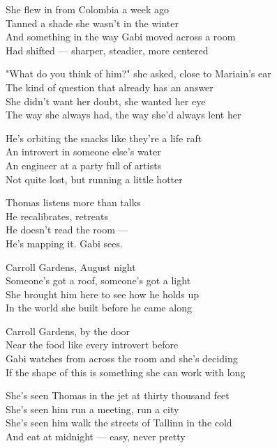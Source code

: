 \begin{lyrics}

She flew in from Colombia a week ago\\
Tanned a shade she wasn't in the winter\\
And something in the way Gabi moved across a room\\
Had shifted — sharper, steadier, more centered

"What do you think of him?" she asked, close to Mariain's ear\\
The kind of question that already has an answer\\
She didn't want her doubt, she wanted her eye\\
The way she always had, the way she'd always lent her

He's orbiting the snacks like they're a life raft\\
An introvert in someone else's water\\
An engineer at a party full of artists\\
Not quite lost, but running a little hotter

Thomas listens more than talks\\
He recalibrates, retreats\\
He doesn't read the room —\\
He's mapping it. %
Gabi sees.

Carroll Gardens, August night\\
Someone's got a roof, someone's got a light\\
She brought him here to see how he holds up\\
In the world she built before he came along

Carroll Gardens, by the door\\
Near the food like every introvert before\\
Gabi watches from across the room and she's deciding\\
If the shape of this is something she can work with long

She's seen Thomas in the jet at thirty thousand feet\\
She's seen him run a meeting, run a city\\
She's seen him walk the streets of Tallinn in the cold\\
And eat at midnight — easy, never pretty


\end{lyrics}
